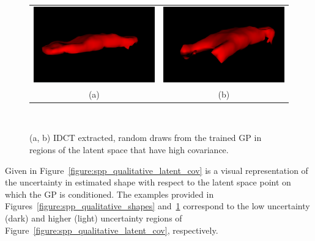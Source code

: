\begin{figure}[!htbp]
  \centering
  \begin{tabular}{cc}
    \includegraphics[width=.4\linewidth]{figures/spp/gp_draws/bad/0.png}&
		\includegraphics[width=.4\linewidth]{figures/spp/gp_draws/bad/1.png}\\
    (a) & (b)
  \end{tabular}
  \caption[Bad GP Shape Draws]
  {
    (a, b) IDCT extracted, random draws from the trained GP in regions of the latent 
    space that have high covariance.
  }
~\label{figure:spp_qualitative_shapes_bad}
\end{figure}

Given in Figure~\ref{figure:spp_qualitative_latent_cov} is a visual representation of the uncertainty 
in estimated shape with respect to the latent space point on which the GP is conditioned. The examples 
provided in Figures~\ref{figure:spp_qualitative_shapes} and~\ref{figure:spp_qualitative_shapes_bad} 
correspond to the low uncertainty (dark) and higher (light) uncertainty regions of 
Figure~\ref{figure:spp_qualitative_latent_cov}, respectively.

